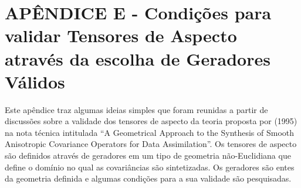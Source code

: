 
\chapter{APÊNDICE E - Condições para validar Tensores de Aspecto através da escolha de Geradores Válidos}
\label{apendiceVII}


Este apêndice traz algumas ideias simples que foram reunidas a partir de discussões sobre a validade dos tensores de aspecto da teoria proposta por  (1995) na nota técnica intitulada ``A Geometrical Approach to the Synthesis of Smooth Anisotropic Covariance Operators for Data Assimilation''. Os tensores de aspecto são definidos através de geradores em um tipo de geometria não-Euclidiana que define o domínio no qual as covariâncias são sintetizadas. Os geradores são entes da geometria definida e algumas condições para a sua validade são pesquisadas. 

